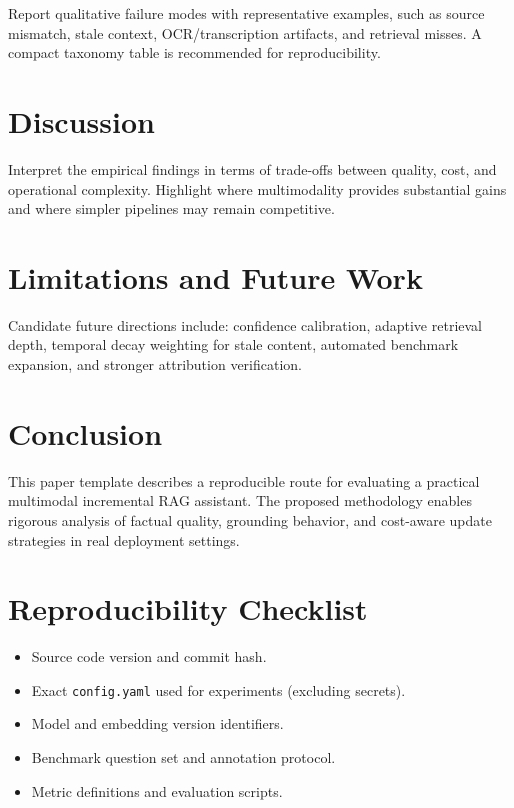 \documentclass[11pt,a4paper]{article}
\begin{document}
Report qualitative failure modes with representative examples, such as source mismatch, stale context, OCR/transcription artifacts, and retrieval misses. A compact taxonomy table is recommended for reproducibility.

\section{Discussion}

Interpret the empirical findings in terms of trade-offs between quality, cost, and operational complexity. Highlight where multimodality provides substantial gains and where simpler pipelines may remain competitive.

\section{Limitations and Future Work}

Candidate future directions include: confidence calibration, adaptive retrieval depth, temporal decay weighting for stale content, automated benchmark expansion, and stronger attribution verification.

\section{Conclusion}

This paper template describes a reproducible route for evaluating a practical multimodal incremental RAG assistant. The proposed methodology enables rigorous analysis of factual quality, grounding behavior, and cost-aware update strategies in real deployment settings.

\section*{Reproducibility Checklist}

\begin{itemize}[leftmargin=1.2cm]
	\item Source code version and commit hash.
	\item Exact \texttt{config.yaml} used for experiments (excluding secrets).
	\item Model and embedding version identifiers.
	\item Benchmark question set and annotation protocol.
	\item Metric definitions and evaluation scripts.
\end{itemize}
\end{document}
